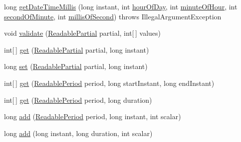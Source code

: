 \begin{DoxyCompactItemize}
\item 
long \hyperlink{classorg_1_1joda_1_1time_1_1chrono_1_1_base_chronology_af03c6d8f92ddafacfd372f30871c3a41}{get\-Date\-Time\-Millis} (long instant, int \hyperlink{classorg_1_1joda_1_1time_1_1chrono_1_1_base_chronology_a3b0ccfe1a1135c79c1d4bef15391c59d}{hour\-Of\-Day}, int \hyperlink{classorg_1_1joda_1_1time_1_1chrono_1_1_base_chronology_acd0a59c7a543845ca3f42583863bd287}{minute\-Of\-Hour}, int \hyperlink{classorg_1_1joda_1_1time_1_1chrono_1_1_base_chronology_a40ab89120f00f86b8c126fbf9b953ea6}{second\-Of\-Minute}, int \hyperlink{classorg_1_1joda_1_1time_1_1chrono_1_1_base_chronology_ab5bc4a6f6580c071e8bf141f2722a828}{millis\-Of\-Second})  throws Illegal\-Argument\-Exception     
\item 
void \hyperlink{classorg_1_1joda_1_1time_1_1chrono_1_1_base_chronology_a71723a248439bb0172cf4cf020b64868}{validate} (\hyperlink{interfaceorg_1_1joda_1_1time_1_1_readable_partial}{Readable\-Partial} partial, int\mbox{[}$\,$\mbox{]} values)
\item 
int\mbox{[}$\,$\mbox{]} \hyperlink{classorg_1_1joda_1_1time_1_1chrono_1_1_base_chronology_a9dae1f80548f03bb38c3959d60623ebf}{get} (\hyperlink{interfaceorg_1_1joda_1_1time_1_1_readable_partial}{Readable\-Partial} partial, long instant)
\item 
long \hyperlink{classorg_1_1joda_1_1time_1_1chrono_1_1_base_chronology_a63fcc94d72e5bffc3b8ecef95dda4a53}{set} (\hyperlink{interfaceorg_1_1joda_1_1time_1_1_readable_partial}{Readable\-Partial} partial, long instant)
\item 
int\mbox{[}$\,$\mbox{]} \hyperlink{classorg_1_1joda_1_1time_1_1chrono_1_1_base_chronology_a4bee24c3e677791059506421f7444689}{get} (\hyperlink{interfaceorg_1_1joda_1_1time_1_1_readable_period}{Readable\-Period} period, long start\-Instant, long end\-Instant)
\item 
int\mbox{[}$\,$\mbox{]} \hyperlink{classorg_1_1joda_1_1time_1_1chrono_1_1_base_chronology_ad8db96f3a32241cbcf4d909b54735640}{get} (\hyperlink{interfaceorg_1_1joda_1_1time_1_1_readable_period}{Readable\-Period} period, long duration)
\item 
long \hyperlink{classorg_1_1joda_1_1time_1_1chrono_1_1_base_chronology_a285d469b524adb656136edea99f4d882}{add} (\hyperlink{interfaceorg_1_1joda_1_1time_1_1_readable_period}{Readable\-Period} period, long instant, int scalar)
\item 
long \hyperlink{classorg_1_1joda_1_1time_1_1chrono_1_1_base_chronology_aad1b6eedb53c55dddcb3700b441c5eaa}{add} (long instant, long duration, int scalar)

\end{DoxyCompactItemize}
